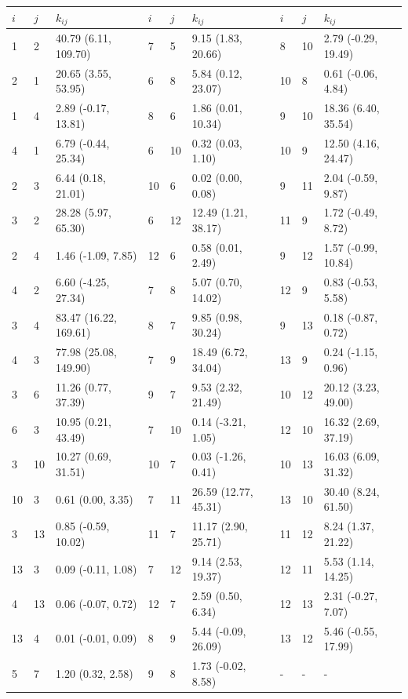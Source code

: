 \begin{table}[]
 \centering
 \label{tab:sens_2_rate_matrix}
 \begin{tabular}{lllllllll}
 \toprule
 $i$ & $j$ &  $k_{ij}$ & $i$ & $j$ &  $k_{ij}$ & $i$ & $j$ &  $k_{ij}$ \\
 \midrule
 1 & 2 & 40.79 (6.11, 109.70) & 7 & 5 & 9.15 (1.83, 20.66) & 8 & 10 & 2.79 (-0.29, 19.49) \\
 2 & 1 & 20.65 (3.55, 53.95) & 6 & 8 & 5.84 (0.12, 23.07) & 10 & 8 & 0.61 (-0.06, 4.84) \\
 1 & 4 & 2.89 (-0.17, 13.81) & 8 & 6 & 1.86 (0.01, 10.34) & 9 & 10 & 18.36 (6.40, 35.54) \\
 4 & 1 & 6.79 (-0.44, 25.34) & 6 & 10 & 0.32 (0.03, 1.10) & 10 & 9 & 12.50 (4.16, 24.47) \\
 2 & 3 & 6.44 (0.18, 21.01) & 10 & 6 & 0.02 (0.00, 0.08) & 9 & 11 & 2.04 (-0.59, 9.87) \\
 3 & 2 & 28.28 (5.97, 65.30) & 6 & 12 & 12.49 (1.21, 38.17) & 11 & 9 & 1.72 (-0.49, 8.72) \\
 2 & 4 & 1.46 (-1.09, 7.85) & 12 & 6 & 0.58 (0.01, 2.49) & 9 & 12 & 1.57 (-0.99, 10.84) \\
 4 & 2 & 6.60 (-4.25, 27.34) & 7 & 8 & 5.07 (0.70, 14.02) & 12 & 9 & 0.83 (-0.53, 5.58) \\
 3 & 4 & 83.47 (16.22, 169.61) & 8 & 7 & 9.85 (0.98, 30.24) & 9 & 13 & 0.18 (-0.87, 0.72) \\
 4 & 3 & 77.98 (25.08, 149.90) & 7 & 9 & 18.49 (6.72, 34.04) & 13 & 9 & 0.24 (-1.15, 0.96) \\
 3 & 6 & 11.26 (0.77, 37.39) & 9 & 7 & 9.53 (2.32, 21.49) & 10 & 12 & 20.12 (3.23, 49.00) \\
 6 & 3 & 10.95 (0.21, 43.49) & 7 & 10 & 0.14 (-3.21, 1.05) & 12 & 10 & 16.32 (2.69, 37.19) \\
 3 & 10 & 10.27 (0.69, 31.51) & 10 & 7 & 0.03 (-1.26, 0.41) & 10 & 13 & 16.03 (6.09, 31.32) \\
 10 & 3 & 0.61 (0.00, 3.35) & 7 & 11 & 26.59 (12.77, 45.31) & 13 & 10 & 30.40 (8.24, 61.50) \\
 3 & 13 & 0.85 (-0.59, 10.02) & 11 & 7 & 11.17 (2.90, 25.71) & 11 & 12 & 8.24 (1.37, 21.22) \\
 13 & 3 & 0.09 (-0.11, 1.08) & 7 & 12 & 9.14 (2.53, 19.37) & 12 & 11 & 5.53 (1.14, 14.25) \\
 4 & 13 & 0.06 (-0.07, 0.72) & 12 & 7 & 2.59 (0.50, 6.34) & 12 & 13 & 2.31 (-0.27, 7.07) \\
 13 & 4 & 0.01 (-0.01, 0.09) & 8 & 9 & 5.44 (-0.09, 26.09) & 13 & 12 & 5.46 (-0.55, 17.99) \\
 5 & 7 & 1.20 (0.32, 2.58) & 9 & 8 & 1.73 (-0.02, 8.58) & - & - &   - \\
 \hline
 \end{tabular}
\end{table}

